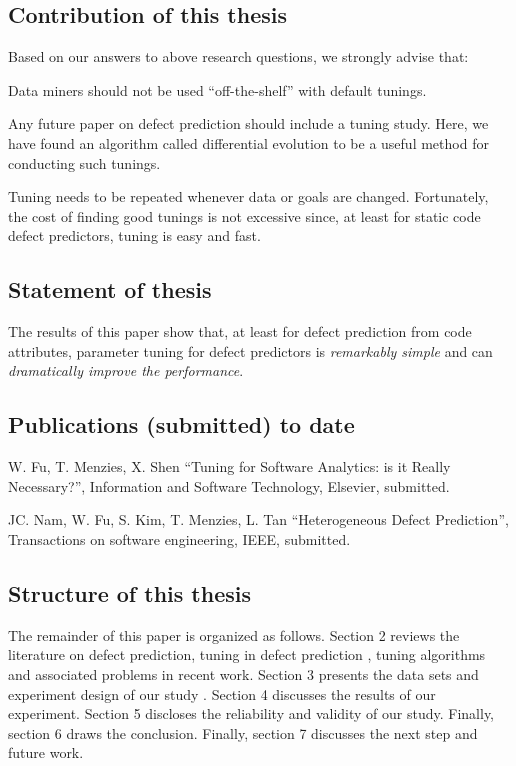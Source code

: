 \subsection{Contribution of this thesis}

Based on our answers to above research questions,  we strongly advise that:
\bi
\item
Data miners should not be used ``off-the-shelf'' with default tunings.
\item
Any future paper on defect prediction should include a 
tuning study. Here, we have found  an algorithm called differential
evolution to be a useful method for conducting such
tunings.
\item
Tuning needs to be repeated
whenever data or goals are changed.
Fortunately, the cost of finding good tunings is not excessive since, at least for
static code defect predictors, tuning is easy and fast.
\ei

\subsection{Statement of thesis}

The results of this paper show that, at least for
defect prediction from  code attributes, parameter tuning for defect predictors is {\em remarkably simple} and can {\em dramatically improve the performance}. 

\subsection{Publications (submitted) to date}

\bi
\item W. Fu, T. Menzies, X. Shen ``Tuning for Software Analytics: is it Really Necessary?'', Information and Software Technology, Elsevier, submitted.

\item JC. Nam, W. Fu, S. Kim, T. Menzies, L. Tan ``Heterogeneous Defect Prediction'', Transactions on software engineering, IEEE, submitted.
\ei

\subsection{Structure of this thesis}

The remainder of this paper is organized as follows. Section 2 reviews the literature on defect prediction, tuning in defect prediction , tuning algorithms and associated problems in recent work. Section 3 presents the data sets and  experiment design of our study . Section 4 discusses the results of our experiment. Section 5 discloses the reliability and validity of our study. Finally, section 6 draws the conclusion. Finally, section 7 discusses the next step and future work.



